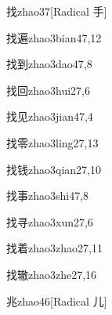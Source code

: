 \begin{verbete}{找}{zhao3}{7}[Radical 手]
\end{verbete}

\begin{verbete}{找遍}{zhao3bian4}{7,12}
\end{verbete}

\begin{verbete}{找到}{zhao3dao4}{7,8}
\end{verbete}

\begin{verbete}{找回}{zhao3hui2}{7,6}
\end{verbete}

\begin{verbete}{找见}{zhao3jian4}{7,4}
\end{verbete}

\begin{verbete}{找零}{zhao3ling2}{7,13}
\end{verbete}

\begin{verbete}{找钱}{zhao3qian2}{7,10}
\end{verbete}

\begin{verbete}{找事}{zhao3shi4}{7,8}
\end{verbete}

\begin{verbete}{找寻}{zhao3xun2}{7,6}
\end{verbete}

\begin{verbete}{找着}{zhao3zhao2}{7,11}
\end{verbete}

\begin{verbete}{找辙}{zhao3zhe2}{7,16}
\end{verbete}

\begin{verbete}{兆}{zhao4}{6}[Radical 儿]
\end{verbete}

